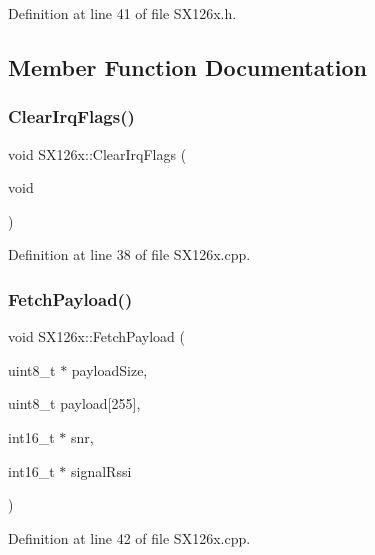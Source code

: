 Definition at line 41 of file S\+X126x.\+h.



\subsection{Member Function Documentation}
\mbox{\label{class_s_x126x_a0e9939c82c76d571d71a69d6941a6780}} 
\subsubsection{\texorpdfstring{Clear\+Irq\+Flags()}{ClearIrqFlags()}}
{\footnotesize\ttfamily void S\+X126x\+::\+Clear\+Irq\+Flags (\begin{DoxyParamCaption}\item[{void}]{ }\end{DoxyParamCaption})}



Definition at line 38 of file S\+X126x.\+cpp.

\mbox{\label{class_s_x126x_a53fde8ee3d816f58b1c493195fd96872}} 
\subsubsection{\texorpdfstring{Fetch\+Payload()}{FetchPayload()}}
{\footnotesize\ttfamily void S\+X126x\+::\+Fetch\+Payload (\begin{DoxyParamCaption}\item[{uint8\+\_\+t $\ast$}]{payload\+Size,  }\item[{uint8\+\_\+t}]{payload\mbox{[}255\mbox{]},  }\item[{int16\+\_\+t $\ast$}]{snr,  }\item[{int16\+\_\+t $\ast$}]{signal\+Rssi }\end{DoxyParamCaption})}



Definition at line 42 of file S\+X126x.\+cpp.

\mbox{\label{class_s_x126x_ac50ac9d688ef2647e10d471f3cdf0ec0}} 
